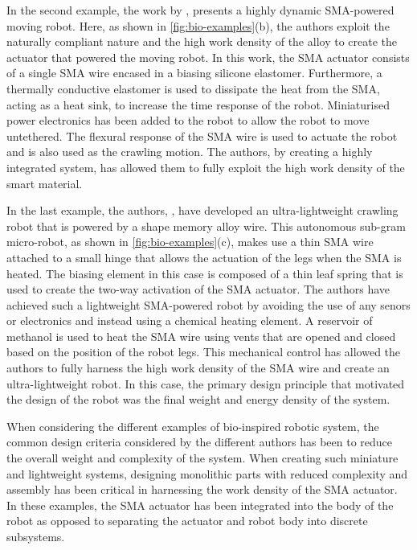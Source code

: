 In the second example, the work by \cite{huangHighlyDynamicShape2019}, presents a highly dynamic SMA-powered moving robot. Here, as shown in \cref{fig:bio-examples}(b), the authors exploit the naturally compliant nature and the high work density of the alloy to create the actuator that powered the moving robot. In this work, the SMA actuator consists of a single SMA wire encased in a biasing silicone elastomer. Furthermore, a thermally conductive elastomer is used to dissipate the heat from the SMA, acting as a heat sink, to increase the time response of the robot. Miniaturised power electronics has been added to the robot to allow the robot to move untethered. The flexural response of the SMA wire is used to actuate the robot and is also used as the crawling motion. The authors, by creating a highly integrated system, has allowed them to fully exploit the high work density of the smart material.

In the last example, the authors, \cite{yang88milligramInsectscaleAutonomous2020a}, have developed an ultra-lightweight crawling robot that is powered by a shape memory alloy wire. This autonomous sub-gram micro-robot, as shown in \cref{fig:bio-examples}(c), makes use a thin SMA wire attached to a small hinge that allows the actuation of the legs when the SMA is heated. The biasing element in this case is composed of a thin leaf spring that is used to create the two-way activation of the SMA actuator. The authors have achieved such a lightweight SMA-powered robot by avoiding the use of any senors or electronics and instead using a chemical heating element. A reservoir of methanol is used to heat the SMA wire using vents that are opened and closed based on the position of the robot legs. This mechanical control has allowed the authors to fully harness the high work density of the SMA wire and create an ultra-lightweight robot. In this case, the primary design principle that motivated the design of the robot was the final weight and energy density of the system.

When considering the different examples of bio-inspired robotic system, the common design criteria considered by the different authors has been to reduce the overall weight and complexity of the system. When creating such miniature and lightweight systems, designing monolithic parts with reduced complexity and assembly has been critical in harnessing the work density of the SMA actuator. In these examples, the SMA actuator has been integrated into the body of the robot as opposed to separating the actuator and robot body into discrete subsystems.

